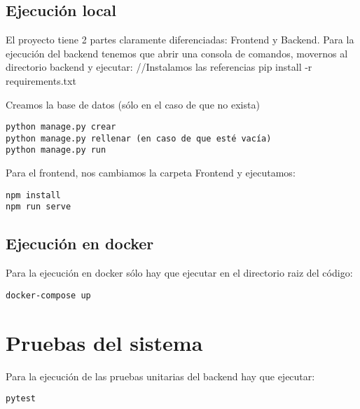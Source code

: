 \subsection {Ejecución local}
El proyecto tiene 2 partes claramente diferenciadas: Frontend y Backend.
Para la ejecución del backend tenemos que abrir una consola de comandos, movernos al directorio backend 
y ejecutar:
//Instalamos las referencias
pip install -r requirements.txt

Creamos la base de datos (sólo en el caso de que no exista)
\begin{verbatim}
python manage.py crear
python manage.py rellenar (en caso de que esté vacía)
python manage.py run
\end{verbatim}

Para el frontend, nos cambiamos la carpeta Frontend y ejecutamos:
\begin{verbatim}
npm install
npm run serve
\end{verbatim}

\subsection {Ejecución en docker}
Para la ejecución en docker sólo hay que ejecutar en el directorio raiz del código:
\begin{verbatim}
docker-compose up
\end{verbatim}

\section{Pruebas del sistema}

Para la ejecución de las pruebas unitarias del backend hay que ejecutar:
\begin{verbatim}
pytest
\end{verbatim}
